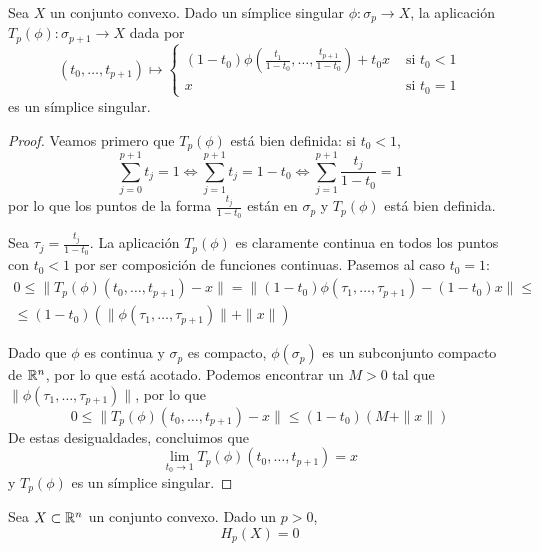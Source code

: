 \begin{lemma}
Sea $X$ un conjunto convexo. Dado un símplice singular $\phi\colon \sigma_{p} \to
X$, la aplicación $T_p(\phi)\colon \sigma_{p+1} \to X$ dada por
\[(t_0,\dots,t_{p+1})\mapsto
\begin{cases}
\displaystyle(1-t_0)
\phi\left(\frac{t_1}{1-t_0},\dots,\frac{t_{p+1}}{1-t_0}\right)+t_0x
&\mbox{ si }t_0 < 1\\
x & \mbox{ si }t_0=1
\end{cases}\]
es un símplice singular.
\end{lemma}

\begin{proof}
Veamos primero que $T_p(\phi)$ está bien definida: si $t_0 < 1$,
\begin{equation}\label{BienDef}
\sum^{p+1}_{j=0}t_j=
1 \iff \sum^{p+1}_{j=1}t_j=
1-t_0 \iff \sum^{p+1}_{j=1}\frac{t_j}{1-t_0}=1
\end{equation}
por lo que los puntos de la forma $\frac{t_j}{1-t_0}$ están en $\sigma_p$ y
$T_p(\phi)$ está bien definida.

Sea $\tau_j=\frac{t_j}{1-t_0}$. La aplicación $T_p(\phi)$ es claramente continua
en todos los puntos con $t_0 < 1$ por ser composición de funciones continuas.
Pasemos al caso $t_0=1$:
\begin{multline*}
0	\leq \|T_p(\phi)(t_0,\dots,t_{p+1})-x\|=
\|(1-t_0)\phi(\tau_1,\dots,\tau_{p+1})-(1-t_0)x\|\leq\\
	\leq (1-t_0)(\|\phi(\tau_1,\dots,\tau_{p+1})\|+\|x\|)
\end{multline*}

Dado que $\phi$ es continua y $\sigma_p$ es compacto, $\phi(\sigma_p)$ es un
subconjunto compacto de $\mathbb{R}^n$, por lo que está acotado. Podemos encontrar un
$M > 0$ tal que $\|\phi(\tau_1,\dots,\tau_{p+1})\|$, por lo que
\[0 \leq \|T_p(\phi)(t_0,\dots,t_{p+1})-x\| \leq (1-t_0)(M+\|x\|)\]
De estas desigualdades, concluimos que
\[\lim_{t_0 \to 1}T_p(\phi)(t_0,\dots,t_{p+1})=x\]
y $T_p(\phi)$ es un símplice singular.
\end{proof}

\begin{theorem}
Sea $X \subset \mathbb{R}^n$ un conjunto convexo. Dado un $p > 0$,
\[H_p(X)=0\]
\end{theorem}

